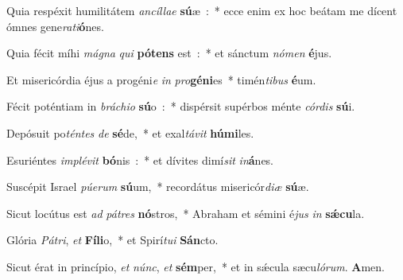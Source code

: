 ﻿\item Quia respéxit humilitátem \emph{an}\-\emph{cíl}\-\emph{lae} \textbf{sú}\-æ~:~* ecce enim ex hoc beátam me dícent ómnes gene\emph{ra}\emph{ti}\textbf{ó}nes.
\item Quia fécit míhi \emph{má}\-\emph{gna} \emph{qui} \textbf{pó}\-\textbf{tens} est~:~* et sánctum \emph{nó}\-\emph{men} \textbf{é}jus.
\item Et misericórdia éjus a progéni\emph{e} \emph{in} \emph{pro}\-\textbf{gé}\-\textbf{ni}\-es~* timén\emph{ti}\-\emph{bus} \textbf{é}um.
\item Fécit poténtiam in \emph{brá}\-\emph{chi}\-\emph{o} \textbf{sú}\-o~:~* dispérsit supérbos ménte \emph{cór}\-\emph{dis} \textbf{sú}i.
\item Depósuit po\emph{tén}\-\emph{tes} \emph{de} \textbf{sé}\-de,~* et exal\emph{tá}\-\emph{vit} \textbf{hú}\textbf{mi}les.
\item Esuriéntes \emph{im}\-\emph{plé}\-\emph{vit} \textbf{bó}\-nis~:~* et dívites dimí\emph{sit} \emph{in}\textbf{á}nes.
\item Suscépit Israel \emph{pú}\-\emph{e}\-\emph{rum} \textbf{sú}\-um,~* recordátus misericór\emph{di}\-\emph{æ} \textbf{sú}æ.
\item Sicut locútus est \emph{ad} \emph{pá}\-\emph{tres} \textbf{nó}\-stros,~* Abraham et sémini é\emph{jus} \emph{in} \textbf{sǽ}\textbf{cu}la.
\item Glória \emph{Pá}\-\emph{tri}, \emph{et} \textbf{Fí}\-\textbf{li}\-o,~* et Spirí\emph{tu}\-\emph{i} \textbf{Sán}cto.
\item Sicut érat in princípio, \emph{et} \emph{núnc}, \emph{et} \textbf{sém}\-per,~* et in sǽcula sæcu\emph{ló}\-\emph{rum}. \textbf{A}men.